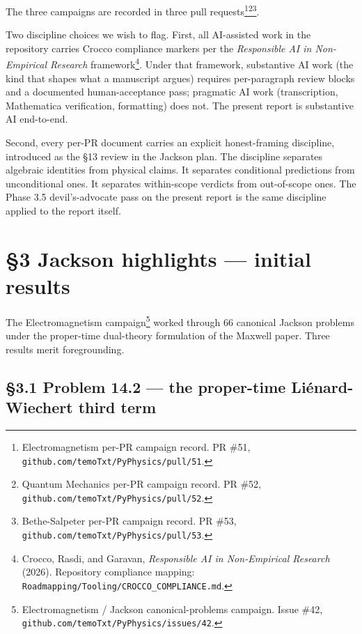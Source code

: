 \documentclass[
  11pt,
]{article}
\begin{document}
The three campaigns are recorded in three pull
requests\footnote{Electromagnetism per-PR campaign record. PR \#51,
  \texttt{github.com/temoTxt/PyPhysics/pull/51}.}\footnote{Quantum
  Mechanics per-PR campaign record. PR \#52,
  \texttt{github.com/temoTxt/PyPhysics/pull/52}.}\footnote{Bethe-Salpeter
  per-PR campaign record. PR \#53,
  \texttt{github.com/temoTxt/PyPhysics/pull/53}.}.

Two discipline choices we wish to flag. First, all AI-assisted work in
the repository carries Crocco compliance markers per the
\emph{Responsible AI in Non-Empirical Research} framework\footnote{Crocco,
  Rasdi, and Garavan, \emph{Responsible AI in Non-Empirical Research}
  (2026). Repository compliance mapping:
  \texttt{Roadmapping/Tooling/CROCCO\_COMPLIANCE.md}.}. Under that
framework, substantive AI work (the kind that shapes what a manuscript
argues) requires per-paragraph review blocks and a documented
human-acceptance pass; pragmatic AI work (transcription, Mathematica
verification, formatting) does not. The present report is substantive AI
end-to-end.

Second, every per-PR document carries an explicit honest-framing
discipline, introduced as the §13 review in the Jackson plan. The
discipline separates algebraic identities from physical claims. It
separates conditional predictions from unconditional ones. It separates
within-scope verdicts from out-of-scope ones. The Phase 3.5
devil's-advocate pass on the present report is the same discipline
applied to the report itself.

\hypertarget{jackson-highlights-initial-results}{%
\section{§3 Jackson highlights --- initial
results}\label{jackson-highlights-initial-results}}

The Electromagnetism campaign\footnote{Electromagnetism / Jackson
  canonical-problems campaign. Issue \#42,
  \texttt{github.com/temoTxt/PyPhysics/issues/42}.} worked through 66
canonical Jackson problems under the proper-time dual-theory formulation
of the Maxwell paper. Three results merit foregrounding.

\hypertarget{problem-14.2-the-proper-time-liuxe9nard-wiechert-third-term}{%
\subsection{§3.1 Problem 14.2 --- the proper-time Liénard-Wiechert third
term}\label{problem-14.2-the-proper-time-liuxe9nard-wiechert-third-term}}
\end{document}
